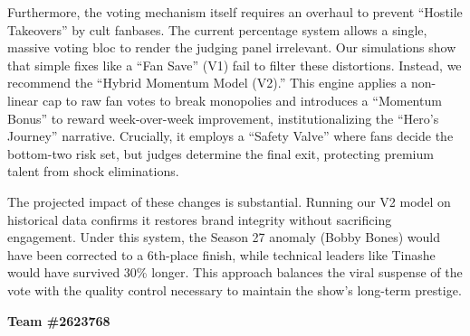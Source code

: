 \documentclass[12pt]{article}
\begin{document}
Furthermore, the voting mechanism itself requires an overhaul to prevent ``Hostile Takeovers'' by cult fanbases. The current percentage system allows a single, massive voting bloc to render the judging panel irrelevant. Our simulations show that simple fixes like a ``Fan Save'' (V1) fail to filter these distortions. Instead, we recommend the ``Hybrid Momentum Model (V2).'' This engine applies a non-linear cap to raw fan votes to break monopolies and introduces a ``Momentum Bonus'' to reward week-over-week improvement, institutionalizing the ``Hero's Journey'' narrative. Crucially, it employs a ``Safety Valve'' where fans decide the bottom-two risk set, but judges determine the final exit, protecting premium talent from shock eliminations.

The projected impact of these changes is substantial. Running our V2 model on historical data confirms it restores brand integrity without sacrificing engagement. Under this system, the Season 27 anomaly (Bobby Bones) would have been corrected to a 6th-place finish, while technical leaders like Tinashe would have survived 30\% longer. This approach balances the viral suspense of the vote with the quality control necessary to maintain the show's long-term prestige.

\vspace{2em}

\hfill \textbf{Team \#2623768}


\end{document}
